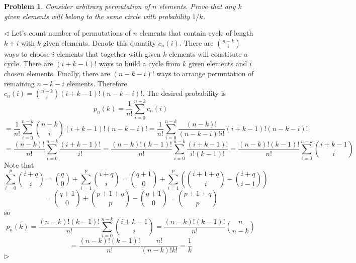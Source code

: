 \documentclass[12pt]{article}
\newtheorem{problem}{Problem}[subsection]
\newenvironment{solution}{\par $\triangleleft$}{$\triangleright$}
\begin{document}
\begin{problem} Consider arbitrary permutation of $n$ elements. Prove that any
$k$ given  elements will belong to the same circle with probability $1/k$.
\end{problem}
\begin{solution} Let's count number of permutations of $n$ elements that contain
    cycle of length $k+i$ with $k$ given elements. Denote this quantity
    $c_n(i)$. There are $\binom{n-k}{i}$ ways to choose $i$ elements that
    together with given $k$ elements will constitute a cycle. There are
    $(i+k-1){!}$ ways to build a cycle from $k$ given elements and $i$ chosen
    elements. Finally, there are $(n-k-i){!}$ ways to arrange permutation of
    remaining $n-k-i$ elements. Therefore
    $c_n(i)=\binom{n-k}{i}(i+k-1)!(n-k-i){!}$. The desired probability is
    $$
        p_n(k)
        =\frac{1}{n!}\sum_{i=0}^{n-k} c_n(i)
    $$
    $$
        =\frac{1}{n!}\sum_{i=0}^{n-k} \binom{n-k}{i}(i+k-1)!(n-k-i)!
        =\frac{1}{n!}\sum_{i=0}^{n-k} \frac{(n-k)!}{(n-k-i)!i!}(i+k-1)!(n-k-i)!
    $$
    $$
        =\frac{(n-k)!}{n!}\sum_{i=0}^{n-k} \frac{(i+k-1)!}{i!}
        =\frac{(n-k)!(k-1)!}{n!}\sum_{i=0}^{n-k} \frac{(i+k-1)!}{i!(k-1)!}
        =\frac{(n-k)!(k-1)!}{n!}\sum_{i=0}^{n-k} \binom{i+k-1}{i}
    $$
    Note that
    $$
        \sum_{i=0}^{p}\binom{i+q}{i}
        =\binom{q}{0}+\sum_{i=1}^{p}\binom{i+q}{i}
        =\binom{q+1}{0}+
        \sum_{i=1}^{p}\left(\binom{i+1+q}{i}-\binom{i+q}{i-1}\right)
    $$
    $$
        =\binom{q+1}{0}+\binom{p+1+q}{p}-\binom{q+1}{0}
        =\binom{p+1+q}{p}
    $$
    so
    $$
        p_n(k)
        =\frac{(n-k)!(k-1)!}{n!}\sum_{i=0}^{n-k} \binom{i+k-1}{i}
        =\frac{(n-k)!(k-1)!}{n!}\binom{n}{n-k}
    $$
    $$
        =\frac{(n-k)!(k-1)!}{n!}\frac{n!}{(n-k)!k!}
        =\frac{1}{k}
    $$
\end{solution}
\end{document}
